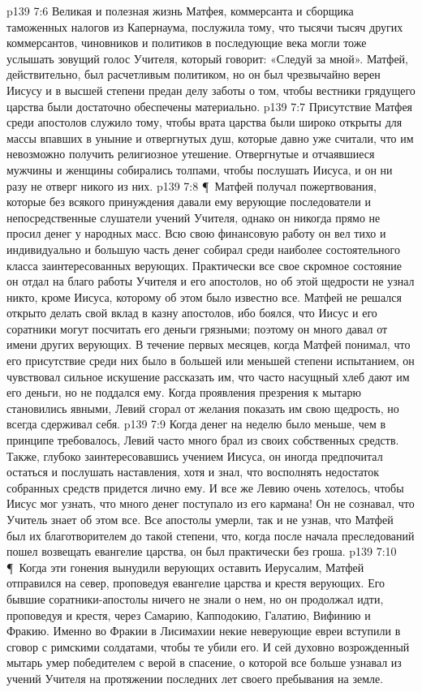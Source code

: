 \vs p139 7:6 Великая и полезная жизнь Матфея, коммерсанта и сборщика таможенных налогов из Капернаума, послужила тому, что тысячи тысяч других коммерсантов, чиновников и политиков в последующие века могли тоже услышать зовущий голос Учителя, который говорит: «Следуй за мной». Матфей, действительно, был расчетливым политиком, но он был чрезвычайно верен Иисусу и в высшей степени предан делу заботы о том, чтобы вестники грядущего царства были достаточно обеспечены материально.
\vs p139 7:7 Присутствие Матфея среди апостолов служило тому, чтобы врата царства были широко открыты для массы впавших в уныние и отвергнутых душ, которые давно уже считали, что им невозможно получить религиозное утешение. Отвергнутые и отчаявшиеся мужчины и женщины собирались толпами, чтобы послушать Иисуса, и он ни разу не отверг никого из них.
\vs p139 7:8 \P\ Матфей получал пожертвования, которые без всякого принуждения давали ему верующие последователи и непосредственные слушатели учений Учителя, однако он никогда прямо не просил денег у народных масс. Всю свою финансовую работу он вел тихо и индивидуально и большую часть денег собирал среди наиболее состоятельного класса заинтересованных верующих. Практически все свое скромное состояние он отдал на благо работы Учителя и его апостолов, но об этой щедрости не узнал никто, кроме Иисуса, которому об этом было известно все. Матфей не решался открыто делать свой вклад в казну апостолов, ибо боялся, что Иисус и его соратники могут посчитать его деньги грязными; поэтому он много давал от имени других верующих. В течение первых месяцев, когда Матфей понимал, что его присутствие среди них было в большей или меньшей степени испытанием, он чувствовал сильное искушение рассказать им, что часто насущный хлеб дают им его деньги, но не поддался ему. Когда проявления презрения к мытарю становились явными, Левий сгорал от желания показать им свою щедрость, но всегда сдерживал себя.
\vs p139 7:9 Когда денег на неделю было меньше, чем в принципе требовалось, Левий часто много брал из своих собственных средств. Также, глубоко заинтересовавшись учением Иисуса, он иногда предпочитал остаться и послушать наставления, хотя и знал, что восполнять недостаток собранных средств придется лично ему. И все же Левию очень хотелось, чтобы Иисус мог узнать, что много денег поступало из его кармана! Он не сознавал, что Учитель знает об этом все. Все апостолы умерли, так и не узнав, что Матфей был их благотворителем до такой степени, что, когда после начала преследований пошел возвещать евангелие царства, он был практически без гроша.
\vs p139 7:10 \P\ Когда эти гонения вынудили верующих оставить Иерусалим, Матфей отправился на север, проповедуя евангелие царства и крестя верующих. Его бывшие соратники\hyp{}апостолы ничего не знали о нем, но он продолжал идти, проповедуя и крестя, через Самарию, Капподокию, Галатию, Вифинию и Фракию. Именно во Фракии в Лисимахии некие неверующие евреи вступили в сговор с римскими солдатами, чтобы те убили его. И сей духовно возрожденный мытарь умер победителем с верой в спасение, о которой все больше узнавал из учений Учителя на протяжении последних лет своего пребывания на земле.
